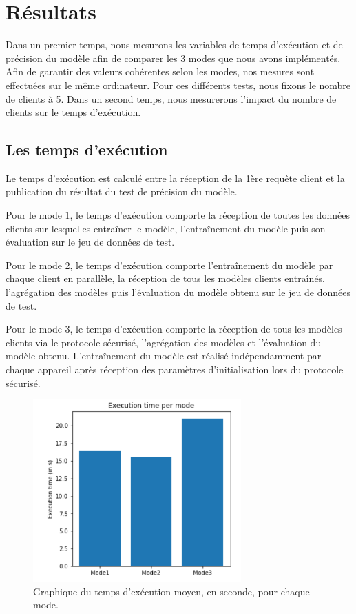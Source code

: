 \documentclass{article}
\begin{document}
\section{Résultats}
Dans un premier temps, nous mesurons les variables de temps d'exécution et de précision du modèle afin de comparer les 3 modes que nous avons implémentés. Afin de garantir des valeurs cohérentes selon les modes, nos mesures sont effectuées sur le même ordinateur. Pour ces différents tests, nous fixons le nombre de clients à 5.
Dans un second temps, nous mesurerons l'impact du nombre de clients sur le temps d'exécution.
\subsection{Les temps d'exécution}
Le temps d'exécution est calculé entre la réception de la 1ère requête client et la publication du résultat du test de précision du modèle.

Pour le mode 1, le temps d'exécution comporte la réception de toutes les données clients sur lesquelles entraîner le modèle, l'entraînement du modèle puis son évaluation sur le jeu de données de test.

Pour le mode 2, le temps d'exécution comporte l'entraînement du modèle par chaque client en parallèle, la réception de tous les modèles clients entraînés, l'agrégation  des modèles puis l’évaluation du modèle obtenu sur le jeu de données de test.

Pour le mode 3, le temps d'exécution comporte la réception de tous les modèles clients via le protocole sécurisé, l'agrégation des modèles et l’évaluation du modèle obtenu. L'entraînement du modèle est réalisé indépendamment par chaque appareil après réception des paramètres d'initialisation lors du protocole sécurisé.

    \begin{figure}[H]
    \centerline{\includegraphics[width=8cm]{img/graph_execution_time_per_mode.png}}
  \caption{Graphique du temps d'exécution moyen, en seconde, pour chaque mode.}
  \label{fig:graph_time}
\end{figure}
\end{document}
